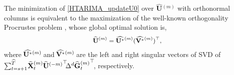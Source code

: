 \documentclass[letterpaper]{article} %
\numberwithin{theorem}{section}
\begin{document}
The minimization of \eqref{HTARIMA_updateU0} over  $\widehat{ \mathbf U}{^{(m)}}$  with orthonormal columns is equivalent to the maximization of the well-known
orthogonality  Procrustes problem \cite{higham1995matrix}, whose global optimal solution is,
\begin{equation} \label{HTARIMA_UpdateU}
\small
\begin{aligned}
\widehat{ \mathbf U}{^{(m)}}   = \widehat{ \mathbf U^*}{^{(m)}} (\widehat{ \mathbf V^*}{^{(m)}}  )^\top,
\end{aligned}
\end{equation}
where $\hspace{-0.05cm}\widehat{ \mathbf U^*}{^{(m)}}\hspace{-0.05cm}$ and $ \hspace{-0.05cm}\widehat{ \mathbf V^*}{^{(m)}}  \hspace{-0.05cm}$
are the left and right singular vectors
of SVD of $ \scriptsize \hspace{-0.01cm}\sum_{t=s+1}^{\widehat{T}}  \hspace{-0.05cm} {\widehat{\mathbf{X}}^{(m)}_{t}}  \hspace{-0.01cm}    \widehat{ \mathbf U}{^{(-m)}}^\top \hspace{-0.1cm} \Delta^d  \hspace{-0.01cm} {\widehat{\mathbf{G}}{^{(m)}_{t}}}^\top \hspace{-0.05cm}$, respectively.
\end{document}
